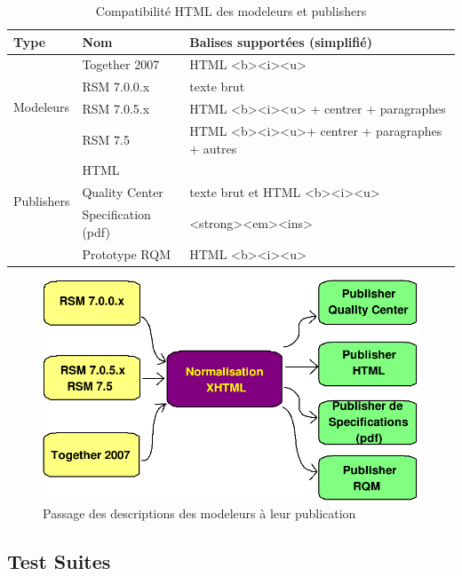 \begin{table}[!ht]
\caption{\label{tableau:compatDescHTML}Compatibilité HTML des modeleurs et publishers}
\begin{tabular}{|l|l|l|}
  \hline
  Type & Nom & Balises supportées (simplifié) \\
  \hline
  \hline
  \multirow{4}{*}{Modeleurs} & Together 2007 & HTML <b><i><u> \\
    & RSM 7.0.0.x & texte brut\\
    & RSM 7.0.5.x & HTML <b><i><u> + centrer + paragraphes\\ 
   & RSM 7.5 &  HTML <b><i><u>+ centrer + paragraphes + autres\\ \hline
  \multirow{3}{*}{Publishers} & HTML &  \\
    & Quality Center & texte brut et HTML <b><i><u> \\
    & Specification (pdf) & <strong><em><ins>  \\
    & Prototype RQM &  HTML <b><i><u> \\ \hline
\end{tabular}
\end{table}


\begin{figure}[!ht]
\centering
\includegraphics[scale=0.5]{Illustrations/bigDescSchema.png}
\caption{Passage des descriptions des modeleurs à leur publication}
\label{figure:descXHTMLPublisher}
\end{figure}

\subsection{Test Suites}

